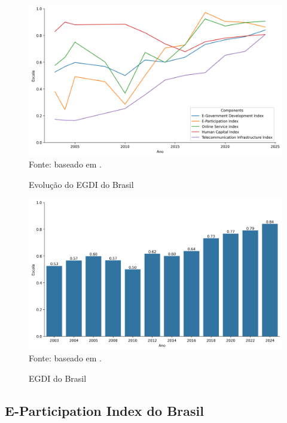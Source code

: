 \begin{figure}[H]
	\centering
	\caption{Evolução do EGDI do Brasil}
	\includegraphics[width=1\linewidth]{figuras/egdi/lineplot_egdi_brasil.png}
	\label{fig:lineplot_egdi_brasil}
	\footnotesize{Fonte: baseado em \cite{ONU_EGDI_mapa}.}
\end{figure}

\begin{figure}[H]
	\centering
	\caption{EGDI do Brasil}
	\includegraphics[width=1\linewidth]{figuras/egdi/egdi_brasil_egov.png}
	\label{fig:egdi_brasil_egov}
	\footnotesize{Fonte: baseado em \cite{ONU_EGDI_mapa}.}
\end{figure}

\subsection{E-Participation Index do Brasil}


